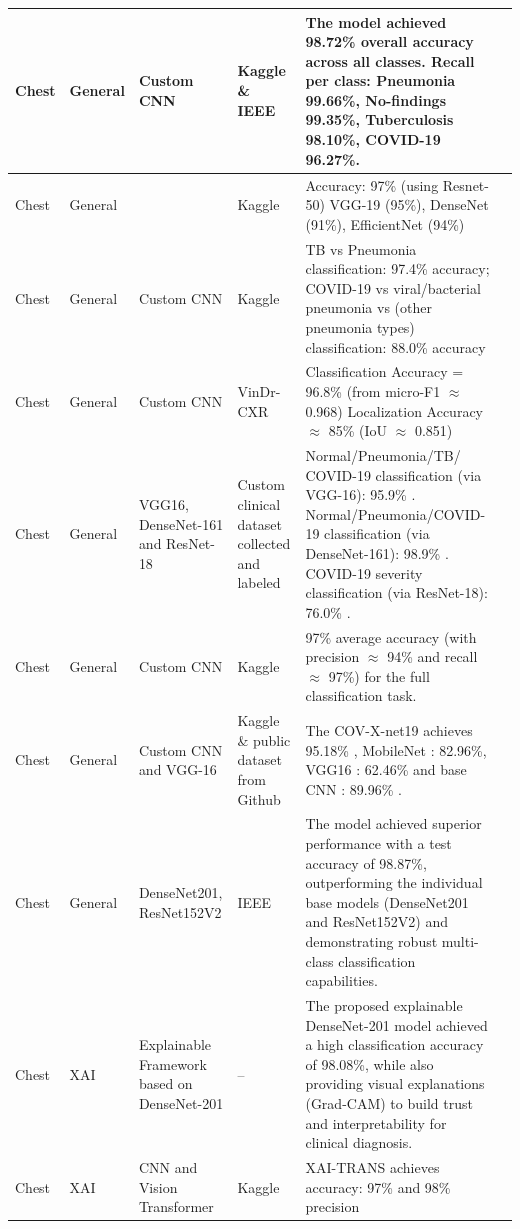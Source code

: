 \begin{center}
\begin{longtable}{|p{1cm}|p{1.5cm}|p{2cm}|p{1.8cm}|p{5cm}|p{1.2cm}|}
		Chest & General & Custom CNN & Kaggle \& IEEE & The model achieved 98.72\% overall accuracy across all classes. Recall per class: Pneumonia 99.66\%, No-findings 99.35\%, Tuberculosis 98.10\%, COVID-19 96.27\%. & \cite{ref10} \\
		\hline
		Chest & General & & Kaggle & Accuracy: 97\% (using Resnet-50) VGG-19 (95\%), DenseNet (91\%), EfficientNet (94\%) & \cite{ref11} \\
		\hline
		Chest & General & Custom CNN & Kaggle & TB vs Pneumonia classification: 97.4\% accuracy; COVID-19 vs viral/bacterial pneumonia vs (other pneumonia types) classification: 88.0\% accuracy & \cite{ref12} \\
		\hline
		Chest & General & Custom CNN & VinDr-CXR & Classification Accuracy = 96.8\% (from micro-F1 $\approx$ 0.968) Localization Accuracy $\approx$ 85\% (IoU $\approx$ 0.851) & \cite{ref13} \\
		\hline
		Chest & General & VGG16, DenseNet-161 and ResNet-18 & Custom clinical dataset collected and labeled & Normal/Pneumonia/TB/ COVID-19 classification (via VGG-16): 95.9\% . Normal/Pneumonia/COVID-19 classification (via DenseNet-161): 98.9\% . COVID-19 severity classification (via ResNet-18): 76.0\% . & \cite{ref14} \\
		\hline
		Chest & General & Custom CNN & Kaggle & 97\% average accuracy (with precision $\approx$ 94\% and recall $\approx$ 97\%) for the full classification task. & \cite{ref15} \\
		\hline
		Chest & General & Custom CNN and VGG-16 & Kaggle \& public dataset from Github & The COV-X-net19 achieves 95.18\% , MobileNet :  82.96\%, VGG16 : 62.46\% and  base CNN : 89.96\% . & \cite{ref16} \\
		\hline
		Chest & General & DenseNet201, ResNet152V2 & IEEE & The model achieved superior performance with a test accuracy of 98.87\%, outperforming the individual base models (DenseNet201 and ResNet152V2) and demonstrating robust multi-class classification capabilities. & \cite{ref17} \\
		\hline
		Chest & XAI & Explainable Framework based on DenseNet-201 & -- & The proposed explainable DenseNet-201 model achieved a high classification accuracy of 98.08\%, while also providing visual explanations (Grad-CAM) to build trust and interpretability for clinical diagnosis. & \cite{ref24} \\
		\hline
		Chest & XAI & CNN and Vision Transformer & Kaggle & XAI-TRANS achieves accuracy: 97\% and 98\% precision & \cite{ref25} \\

\end{longtable}
\end{center}
